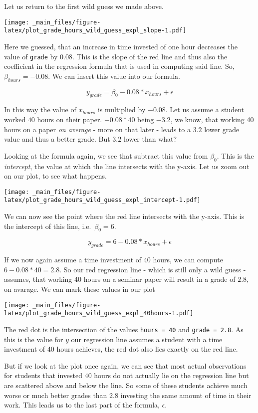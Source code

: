 \documentclass[
]{book}
\begin{document}
Let us return to the first wild guess we made above.

\texttt{[image: \_main\_files/figure-latex/plot\_grade\_hours\_wild\_guess\_expl\_slope-1.pdf]}

Here we guessed, that an increase in time invested of one hour decreases the
value of \texttt{grade} by \(0.08\). This is the slope of the red line and thus also the
coefficient in the regression formula that is used in computing said line. So,
\(\beta_{hours} = -0.08\). We can insert this value into our formula.

\[y_{grade} = \beta_0 -0.08*x_{hours} + \epsilon\]

In this way the value of \(x_{hours}\) is multiplied by \(-0.08\). Let us assume a
student worked \(40\) hours on their paper. \(-0.08*40\) being \(-3.2\), we know, that
working 40 hours on a paper \emph{on average} - more on that later - leads to a \(3.2\)
lower grade value and thus a better grade. But \(3.2\) lower than what?

Looking at the formula again, we see that subtract this value from \(\beta_0\).
This is the \emph{intercept}, the value at which the line intersects with the y-axis.
Let us zoom out on our plot, to see what happens.

\texttt{[image: \_main\_files/figure-latex/plot\_grade\_hours\_wild\_guess\_expl\_intercept-1.pdf]}

We can now see the point where the red line intersects with the y-axis. This is
the intercept of this line, i.e.~\(\beta_0 = 6\).

\[y_{grade} = 6 -0.08*x_{hours} + \epsilon\]

If we now again assume a time investment of \(40\) hours, we can compute
\(6-0.08*40 = 2.8\). So our red regression line - which is still only a wild guess
- assumes, that working 40 hours on a seminar paper will result in a grade of
\(2.8\), on avarage. We can mark these values in our plot

\texttt{[image: \_main\_files/figure-latex/plot\_grade\_hours\_wild\_guess\_expl\_40hours-1.pdf]}

The red dot is the intersection of the values \texttt{hours\ =\ 40} and \texttt{grade\ =\ 2.8}.
As this is the value for \(y\) our regression line assumes a student with a time
investment of 40 hours achieves, the red dot also lies exactly on the red line.

But if we look at the plot once again, we can see that most actual observations
for students that invested 40 hours do not actually lie on the regression line
but are scattered above and below the line. So some of these students achieve
much worse or much better grades than \(2.8\) investing the same amount of time in
their work. This leads us to the last part of the formula, \(\epsilon\).
\end{document}
